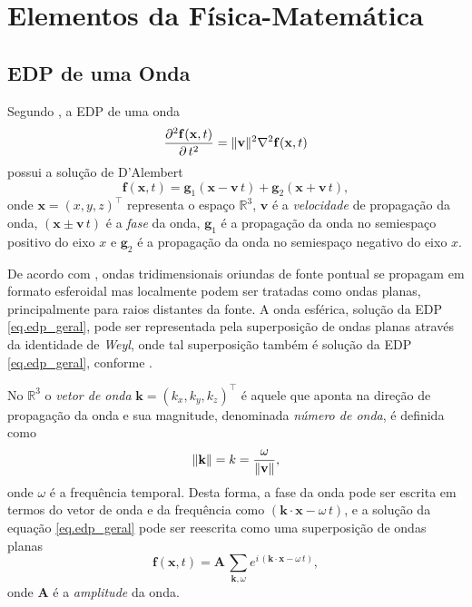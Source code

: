 \chapter{Elementos da F\'isica-Matem\'atica}

\section{EDP de uma Onda}
Segundo \cite{farlow_93}, a EDP de uma onda 
\begin{equation}\label{eq.edp_geral}
\frac{\partial^2\mathbf{f}(\mathbf{x},t)}{\partial\,t^2}=\lVert\mathbf{v}\rVert^2\nabla^2\mathbf{f}(\mathbf{x},t)
\end{equation}
possui a solu\c{c}\~ao de D'Alembert
\begin{equation}
\mathbf{f}(\mathbf{x},t)=\mathbf{g}_1(\mathbf{x}-\mathbf{v}\,t)+\mathbf{g}_2(\mathbf{x}+\mathbf{v}\,t),
\end{equation}
onde $\mathbf{x}=(x,y,z)^\top$ representa o espa\c{c}o $\mathbb{R}^3$, $\mathbf{v}$ \'e a \textit{velocidade} de propaga\c{c}\~ao da onda, $(\mathbf{x}\pm\mathbf{v}\,t)$ \'e a \textit{fase} da onda, $\mathbf{g}_1$ \'e a propaga\c{c}\~ao da onda no semiespa\c{c}o positivo do eixo $x$ e $\mathbf{g}_2$ \'e a propaga\c{c}\~ao da onda no semiespa\c{c}o negativo do eixo $x$.

De acordo com \cite{chew}, ondas tridimensionais oriundas de fonte pontual se propagam em formato esferoidal mas localmente podem ser tratadas como ondas planas, principalmente para raios distantes da fonte. A onda esf\'erica, solu\c{c}\~ao da EDP \ref{eq.edp_geral}, pode ser representada pela superposi\c{c}\~ao de ondas planas atrav\'es da identidade de \textit{Weyl}, onde tal superposi\c{c}\~ao tamb\'em \'e solu\c{c}\~ao da EDP \ref{eq.edp_geral}, conforme \cite{weyl_19}.

No $\mathbb{R}^3$ o \textit{vetor de onda} $\mathbf{k}=(k_x,k_y,k_z)^\top$ \'e aquele que aponta na dire\c{c}\~ao de propaga\c{c}\~ao da onda e sua magnitude, denominada \textit{n\'umero de onda}, \'e definida como 
\begin{equation}
\lVert\mathbf{k}\rVert=k=\frac{\omega}{\lVert\mathbf{v}\rVert},
\end{equation}
onde $\omega$ \'e a frequ\^encia temporal. Desta forma, a fase da onda pode ser escrita em termos do vetor de onda e da frequ\^encia como $(\mathbf{k}\cdot\mathbf{x}-\omega\,t)$, e a solu\c{c}\~ao da equa\c{c}\~ao \ref{eq.edp_geral} pode ser reescrita como uma superposi\c{c}\~ao de ondas planas
\begin{equation}
\mathbf{f}(\mathbf{x},t)=\mathbf{A}\,\sum_{\mathbf{k},\omega}{e^{i\,(\mathbf{k}\cdot\mathbf{x}-\omega\,t)}},
\end{equation}
onde $\mathbf{A}$ \'e a \textit{amplitude} da onda.

